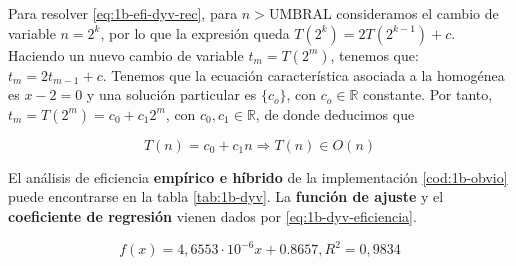 Para resolver \ref{eq:1b-efi-dyv-rec}, para $n > \text{UMBRAL}$
consideramos el cambio
de variable $n = 2^k$, por lo que la expresión queda $T(2^k) = 2T(2^{k-1}) + c$. Haciendo
un nuevo cambio de variable $t_m = T(2^m)$, tenemos que:
$t_m = 2 t_{m-1} + c$. Tenemos que la ecuación característica
asociada a la homogénea es $x-2 = 0$ y una solución particular 
es $\{c_o\}$, con $c_o \in \mathbb R$ constante. Por tanto, $t_m = T(2^m) = c_0 + c_1 2^m$,
con $c_0, c_1 \in \mathbb R$, de donde deducimos que 

\begin{equation}
    T(n) = c_0 + c_1 n \Rightarrow \boxed{T(n) \in O(n)}
\end{equation}

El análisis de eficiencia \textbf{empírico e híbrido}
de la implementación \ref{cod:1b-obvio} puede encontrarse en la tabla \ref{tab:1b-dyv}. La 
\textbf{función de ajuste} y el \textbf{coeficiente de regresión} vienen dados 
por \ref{eq:1b-dyv-eficiencia}.

\begin{equation}
    \boxed{f(x) = 4,6553 \cdot 10^{-6} x + 0.8657, R^2 = 0,9834}
    \label{eq:1b-dyv-eficiencia}
\end{equation}

